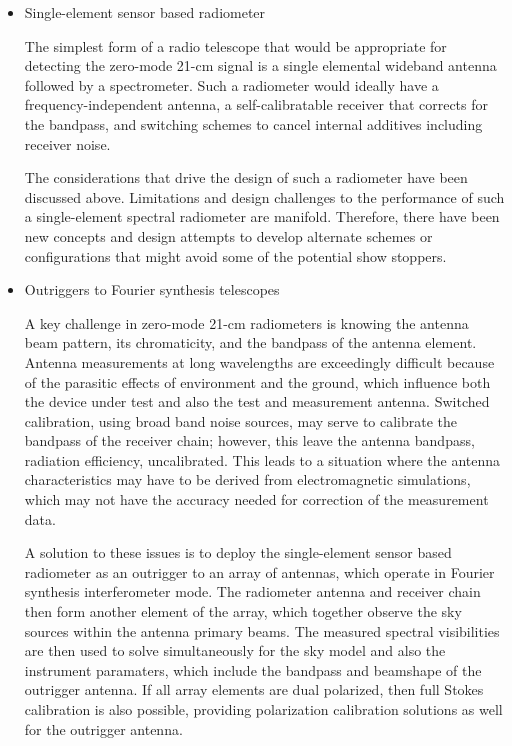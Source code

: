 \begin{itemize}
\item
  Single-element sensor based radiometer
  
  The simplest form of a radio telescope that would be appropriate for detecting the zero-mode 21-cm signal is a single elemental wideband antenna followed by a spectrometer.  Such a radiometer would ideally have a frequency-independent antenna, a self-calibratable receiver that corrects for the bandpass, and switching schemes to cancel internal additives including receiver noise.
  
  The considerations that drive the design of such a radiometer have been discussed above.  Limitations and design challenges to the performance of such a single-element spectral radiometer are manifold.  Therefore, there have been new concepts and design attempts to develop alternate schemes or configurations that might avoid some of the potential show stoppers.
  
\item
  Outriggers to Fourier synthesis telescopes
  
  A key challenge in zero-mode 21-cm radiometers is knowing the antenna beam pattern, its chromaticity, and the bandpass of the antenna element.  Antenna measurements at long wavelengths are exceedingly difficult because of the parasitic effects of environment and the ground, which influence both the device under test and also the test and measurement antenna.  Switched calibration, using broad band noise sources, may serve to calibrate the bandpass of the receiver chain; however, this leave the antenna bandpass, radiation efficiency, uncalibrated.  This leads to a situation where the antenna characteristics may have to be derived from electromagnetic simulations, which may not have the accuracy needed for correction of the measurement data.
  
  A solution to these issues is to deploy the single-element sensor based radiometer as an outrigger to an array of antennas, which operate in Fourier synthesis interferometer mode.  The radiometer antenna and receiver chain then form another element of the array, which together observe the sky sources within the antenna primary beams.  The measured spectral visibilities are then used to solve simultaneously for the sky model and also the instrument paramaters, which include the bandpass and beamshape of the outrigger antenna. If all array elements are dual polarized, then full Stokes calibration is also possible, providing polarization calibration solutions as well for the outrigger antenna.
  

\end{itemize}
